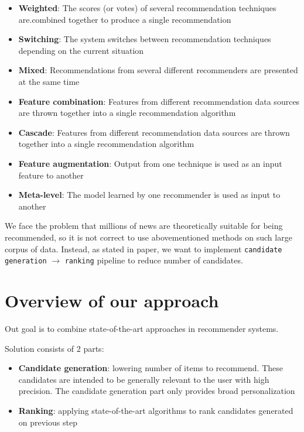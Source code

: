 \documentclass{article}
\begin{document}
\begin{itemize}
    \item \textbf{Weighted}: The scores (or votes) of several recommendation techniques are.combined together to produce a single recommendation
    \item \textbf{Switching}: The system switches between recommendation techniques depending on the current situation
    \item \textbf{Mixed}: Recommendations from several different recommenders are presented at the same time
    \item \textbf{Feature combination}: Features from different recommendation data sources are thrown together into a single recommendation algorithm
    \item \textbf{Cascade}: Features from different recommendation data sources are thrown together into a single recommendation algorithm 
    \item \textbf{Feature augmentation}: Output from one technique is used as an input feature to another
    \item \textbf{Meta-level}: The model learned by one recommender is used as input to another
\end{itemize}


We face the problem that millions of news are theoretically suitable for being recommended, so it is not correct to use abovementioned methods on such large corpus of data. Instead, as stated in \citep{youtube} paper, we want to implement \texttt{candidate generation} $\to$ \texttt{ranking} pipeline to reduce number of candidates.

\section{Overview of our approach}
\label{sec:overview}


Out goal is to combine state-of-the-art approaches in recommender systems.

Solution consists of 2 parts:

\begin{itemize}
    \item \textbf{Candidate generation}: lowering number of items to recommend. These candidates are intended to be generally relevant to the user with high precision. The candidate generation part only provides broad personalization
    \item \textbf{Ranking}: applying state-of-the-art algorithms to rank candidates generated on previous step
\end{itemize}
\end{document}
